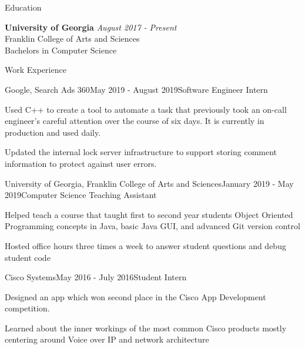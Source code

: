 \documentclass{resume} %
\begin{document}

\begin{rSection}{Education}

{\bf University of Georgia} \hfill {\em August 2017 - Present}
\\ Franklin College of Arts and Sciences
\\ Bachelors in Computer Science

\end{rSection}


\begin{rSection}{Work Experience}

\begin{rSubsection}{Google, Search Ads 360}{May 2019 - August 2019}{Software Engineer Intern}{}
\item Used C++ to create a tool to automate
      a task that previously took an on-call engineer's careful attention over the course of six days. It is currently in production and used daily.
\item Updated the internal lock server infrastructure to support storing comment information 
      to protect against user errors.
\end{rSubsection}


\begin{rSubsection}{University of Georgia, Franklin College of Arts and Sciences}{January 2019 - May 2019}{Computer Science Teaching Assistant}{}
\item Helped teach a course that taught first to second year students Object Oriented Programming concepts in Java, basic Java GUI, and advanced Git version control

\item Hosted office hours three times a week to answer student questions and debug student code

      
\itm   
\end{rSubsection}

\begin{rSubsection}{Cisco Systems}{May 2016 - July 2016}{Student Intern}{}
\item Designed an app which won second place in the Cisco App Development competition.

\item Learned about the inner workings of the most common Cisco products mostly centering around Voice over IP and network architecture
      
\itm   
\end{rSubsection}

\end{rSection}
\end{document}
